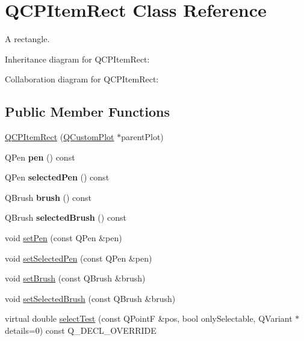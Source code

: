 \hypertarget{classQCPItemRect}{}\section{Q\+C\+P\+Item\+Rect Class Reference}
\label{classQCPItemRect}


A rectangle.  




Inheritance diagram for Q\+C\+P\+Item\+Rect\+:


Collaboration diagram for Q\+C\+P\+Item\+Rect\+:
\subsection*{Public Member Functions}
\begin{DoxyCompactItemize}
\item 
\hyperlink{classQCPItemRect_a412ad1579f7a1fba453d0fa28c496cbc}{Q\+C\+P\+Item\+Rect} (\hyperlink{classQCustomPlot}{Q\+Custom\+Plot} $\ast$parent\+Plot)
\item 
Q\+Pen {\bfseries pen} () const \hypertarget{classQCPItemRect_a3cb7b6de5e82cc5a3c99e9de919a55e6}{}\label{classQCPItemRect_a3cb7b6de5e82cc5a3c99e9de919a55e6}

\item 
Q\+Pen {\bfseries selected\+Pen} () const \hypertarget{classQCPItemRect_a7e701c34e72a4c25647e93fa369f395c}{}\label{classQCPItemRect_a7e701c34e72a4c25647e93fa369f395c}

\item 
Q\+Brush {\bfseries brush} () const \hypertarget{classQCPItemRect_a03d2d26ffcac78b25b8e90915f9c4abe}{}\label{classQCPItemRect_a03d2d26ffcac78b25b8e90915f9c4abe}

\item 
Q\+Brush {\bfseries selected\+Brush} () const \hypertarget{classQCPItemRect_a3b586228393f5c8efa78c4d2a4b25cbf}{}\label{classQCPItemRect_a3b586228393f5c8efa78c4d2a4b25cbf}

\item 
void \hyperlink{classQCPItemRect_a483c0da5a17e1646cd17ddea2c124e7d}{set\+Pen} (const Q\+Pen \&pen)
\item 
void \hyperlink{classQCPItemRect_a52a1bcb2dc753a538e406a2ba3cf21ce}{set\+Selected\+Pen} (const Q\+Pen \&pen)
\item 
void \hyperlink{classQCPItemRect_abbd4e346a03513ee466afc25d9c75446}{set\+Brush} (const Q\+Brush \&brush)
\item 
void \hyperlink{classQCPItemRect_abd1792859844118dedee86223cede7af}{set\+Selected\+Brush} (const Q\+Brush \&brush)
\item 
virtual double \hyperlink{classQCPItemRect_a2e68621b75bae4da6ae0ab2cdd0dd733}{select\+Test} (const Q\+PointF \&pos, bool only\+Selectable, Q\+Variant $\ast$details=0) const Q\+\_\+\+D\+E\+C\+L\+\_\+\+O\+V\+E\+R\+R\+I\+DE
\end{DoxyCompactItemize}
